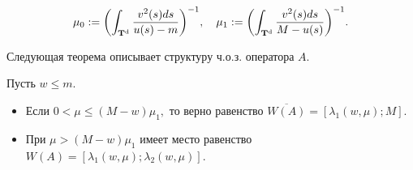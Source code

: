 $$

\mu_0:=\biggl( \int _{{\bf T}^{\rm d}}

\frac{v^{2}(s)ds}{u(s)-m} \biggr)^{-1}, \quad \mu_1:=\biggl(

\int _{{\bf T}^{\rm d}} \frac{v^{2}(s)ds}{M-u(s)}

\biggr)^{-1}.

$$



Следующая теорема описывает структуру ч.о.з. оператора $A$.



\smallskip



\hypertarget{RD:th1}{}



\begin{theorem}[1]Пусть $w \leq m.$

\begin{itemize}

\item[{\rm 1.}] Если $0< \mu \leq (M-w) \mu_1,$ то верно равенство $\overline{W(A)}=[\lambda_1(w, \mu); M].$

\item[{\rm 2.}] При $\mu > (M-w) \mu_1$ имеет место равенство $W(A)=[\lambda_1(w, \mu); \lambda_2(w, \mu)].$

\end{itemize}

\end{theorem}



\smallskip



